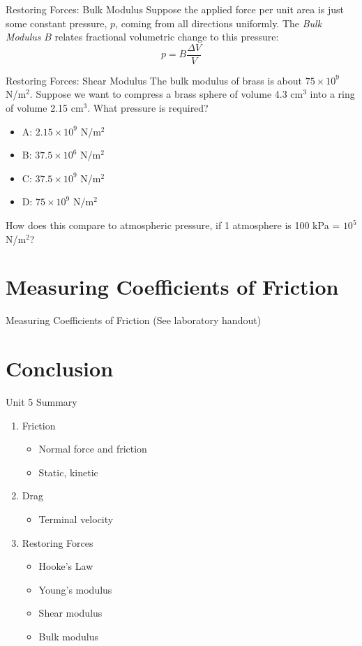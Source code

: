 \documentclass{beamer}
\begin{document}
\begin{frame}{Restoring Forces: Bulk Modulus}
Suppose the applied force per unit area is just some constant pressure, $p$, coming from all directions uniformly.  The \textit{Bulk Modulus} $B$ relates fractional volumetric change to this pressure: \\
\begin{equation}
p = B\frac{\Delta V}{V}
\end{equation}
\end{frame}

\begin{frame}{Restoring Forces: Shear Modulus}
The bulk modulus of brass is about $75 \times 10^{9}$ N/m$^2$.  Suppose we want to compress a brass sphere of volume 4.3 cm$^3$ into a ring of volume 2.15 cm$^3$.  What pressure is required?
\begin{itemize}
\item A: $2.15 \times 10^{9}$ N/m$^2$ 
\item B: $37.5 \times 10^{6}$ N/m$^2$ 
\item C: $37.5 \times 10^{9}$ N/m$^2$ 
\item D: $75 \times 10^{9}$ N/m$^2$ 
\end{itemize}
How does this compare to atmospheric pressure, if 1 atmosphere is 100 kPa = $10^5$ N/m$^2$?
\end{frame}

\section{Measuring Coefficients of Friction}

\begin{frame}{Measuring Coefficients of Friction}
(See laboratory handout)
\end{frame}

\section{Conclusion}

\begin{frame}{Unit 5 Summary}
\begin{enumerate}
\item \alert{Friction}
\begin{itemize}
\item Normal force and friction
\item Static, kinetic
\end{itemize}
\item \alert{Drag}
\begin{itemize}
\item Terminal velocity
\end{itemize}
\item \alert{Restoring Forces}
\begin{itemize}
\item Hooke's Law
\item Young's modulus
\item Shear modulus
\item Bulk modulus
\end{itemize}
\end{enumerate}
\end{frame}
\end{document}
